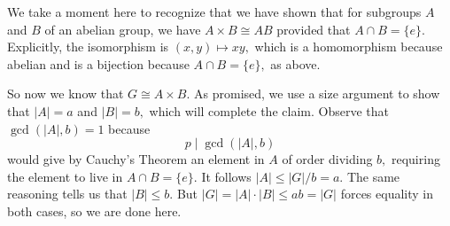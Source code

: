 We take a moment here to recognize that we have shown that for subgroups $A$ and $B$ of an abelian group, we have $A\times B\cong AB$ provided that $A\cap B=\{e\}.$ Explicitly, the isomorphism is $(x,y)\mapsto xy,$ which is a homomorphism because abelian and is a bijection because $A\cap B=\{e\},$ as above.

So now we know that $G\cong A\times B.$ As promised, we use a size argument to show that $|A|=a$ and $|B|=b,$ which will complete the claim. Observe that $\gcd(|A|,b)=1$ because 
\[p\mid\gcd(|A|,b)\]
would give by Cauchy's Theorem an element in $A$ of order dividing $b,$ requiring the element to live in $A\cap B=\{e\}.$ It follows $|A|\le|G|/b=a.$ The same reasoning tells us that $|B|\le b.$ But $|G|=|A|\cdot|B|\le ab=|G|$ forces equality in both cases, so we are done here.